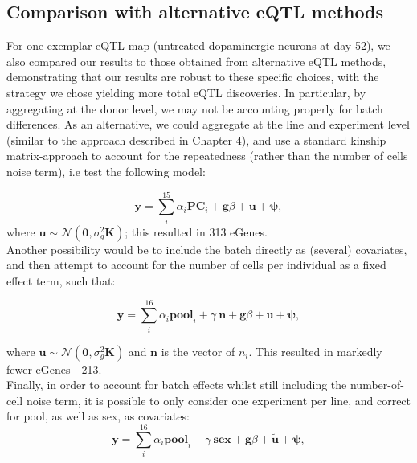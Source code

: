 \subsection{Comparison with alternative eQTL methods}

For one exemplar eQTL map (untreated dopaminergic neurons at day 52), we also compared our results to those obtained from alternative eQTL methods, demonstrating that our results are robust to these specific choices, with the strategy we chose yielding more total eQTL discoveries. 
In particular, by aggregating at the donor level, we may not be accounting properly for batch differences.
As an alternative, we could aggregate at the line and experiment level (similar to the approach described in Chapter 4), and use a standard kinship matrix-approach to account for the repeatedness (rather than the number of cells noise term), i.e test the following model:

\begin{equation}\label{eq:neuroseq_pcs_kinship}
    \mathbf{y} = \sum_i^{15}\alpha_i \mathbf{PC}_i + \mathbf{g}\beta + \mathbf{u} + \boldsymbol{\psi}, 
\end{equation}
where $ \mathbf{u} \sim \mathcal{N}(\mathbf{0},\sigma_g^2\mathbf{K})$;
this resulted in 313 eGenes.\\

Another possibility would be to include the batch directly as (several) covariates, and then attempt to account for the number of cells per individual as a fixed effect term, such that:

\begin{equation}\label{eq:neuroseq_batch_kinship}
    \mathbf{y} = \sum_i^{16}\alpha_i \mathbf{pool}_i + \gamma \ \mathbf{n} + \mathbf{g}\beta + \mathbf{u} + \boldsymbol{\psi}, 
\end{equation}

where $ \mathbf{u} \sim \mathcal{N}(\mathbf{0},\sigma_g^2\mathbf{K})$ and $\mathbf{n}$ is the vector of $n_i$. 
This resulted in markedly fewer eGenes - 213.\\

Finally, in order to account for batch effects whilst still including the number-of-cell noise term, it is possible to only consider one experiment per line, and correct for pool, as well as sex, as covariates:
\begin{equation}\label{eq:neuroseq_batch_ncell}
    \mathbf{y} = \sum_i^{16}\alpha_i \mathbf{pool}_i + \gamma \ \mathbf{sex} + \mathbf{g}\beta + \tilde{\mathbf{u}} + \boldsymbol{\psi}, 
\end{equation}

